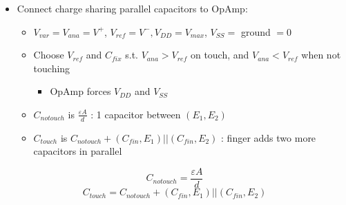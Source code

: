 \documentclass{article}\usepackage{amsmath,amssymb,amsthm,tikz,tkz-graph,color,chngpage,soul,hyperref,csquotes,graphicx,floatrow}\newcommand*{\QEDB}{\hfill\ensuremath{\square}}\newtheorem*{prop}{Proposition}\renewcommand{\theenumi}{\alph{enumi}}\usepackage[shortlabels]{enumitem}\usepackage[nobreak=true]{mdframed}\usetikzlibrary{matrix,calc}\MakeOuterQuote{"}\usepackage[margin=0.75in]{geometry} \newtheorem{theorem}{Theorem}
\begin{document}
\begin{itemize}
    \item Connect charge sharing parallel capacitors to OpAmp:
    \begin{itemize}
        \item $V_{var} = V_{ana} = V^+$, $V_{ref} = V^-, V_{DD} = V_{max}$, $V_{SS} =$ ground $= 0$
        \item Choose $V_{ref}$ and $C_{fix}$ s.t. $V_{ana} > V_{ref}$ on touch, and $V_{ana} < V_{ref}$ when not touching
        \begin{itemize}
            \item OpAmp forces $V_{DD}$ and $V_{SS}$
        \end{itemize}
        \item $C_{notouch}$ is $\frac{\varepsilon A}{d}$ : 1 capacitor between $(E_1, E_2)$
        \item $C_{touch}$ is $C_{notouch} + (C_{fin}, E_1)||(C_{fin}, E_2)$ : finger adds two more capacitors in parallel
    \end{itemize}
\end{itemize}
\begin{mdframed}
\begin{equation}C_{notouch} = \frac{\varepsilon A}{d}\end{equation}
\begin{equation}C_{touch} = C_{notouch} + (C_{fin}, E_1)||(C_{fin}, E_2)\end{equation}
\end{mdframed}
\end{document}
